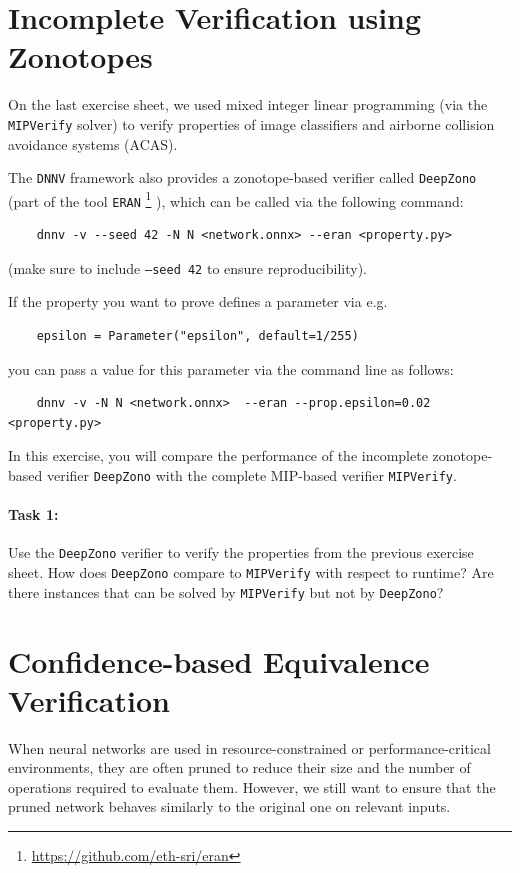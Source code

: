 \documentclass[11pt,fleqn]{article}
\begin{document}

\section*{Incomplete Verification using Zonotopes}

On the last exercise sheet, we used mixed integer linear programming (via the \texttt{MIPVerify} solver) to verify 
properties of image classifiers and airborne collision avoidance systems (ACAS).

The \texttt{DNNV} framework also provides a zonotope-based verifier called \texttt{DeepZono} (part of the tool \texttt{ERAN} \footnote{\url{https://github.com/eth-sri/eran}} ), which can be called via the following command:
\begin{verbatim}
    dnnv -v --seed 42 -N N <network.onnx> --eran <property.py>
\end{verbatim}
(make sure to include \texttt{--seed 42} to ensure reproducibility).

If the property you want to prove defines a parameter via e.g. 
\begin{verbatim}
    epsilon = Parameter("epsilon", default=1/255)
\end{verbatim}
you can pass a value for this parameter via the command line as follows:
\begin{verbatim}
    dnnv -v -N N <network.onnx>  --eran --prop.epsilon=0.02 <property.py>
\end{verbatim}

In this exercise, you will compare the performance of the incomplete zonotope-based verifier \texttt{DeepZono} with the complete MIP-based verifier \texttt{MIPVerify}.

\paragraph{Task 1:}
Use the \texttt{DeepZono} verifier to verify the properties from the previous exercise sheet.
How does \texttt{DeepZono} compare to \texttt{MIPVerify} with respect to runtime?
Are there instances that can be solved by \texttt{MIPVerify} but not by \texttt{DeepZono}?


\section*{Confidence-based Equivalence Verification}

When neural networks are used in resource-constrained or performance-critical environments,
they are often pruned to reduce their size and the number of operations required to evaluate them.
However, we still want to ensure that the pruned network behaves similarly to the original one on relevant inputs.
\end{document}
